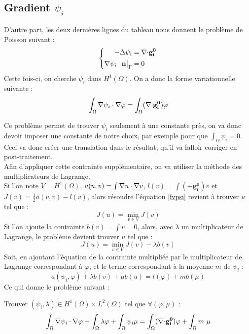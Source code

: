 \subsection{Gradient $\psi_i$}
\label{multLagrange}
D'autre part, les deux dernières lignes du tableau nous donnent le problème de Poisson suivant :
\begin{equation*}
\left\{\begin{aligned}
-{\Delta}\psi_i &= {\nabla\cdot} \mathbf{g_i^0}\\
{\nabla}\psi_i\cdot \mathbf{n}{\big\rvert_{\Gamma}} &= 0
\end{aligned}\right.
\end{equation*}
Cette fois-ci, on cherche $\psi_i$ dans $H^1(\Omega)$. On a donc la forme variationnelle suivante :
\begin{equation}\label{fvpsi}
\int_\Omega {\nabla}\psi_i\cdot{\nabla}\varphi = \int_\Omega ({\nabla\cdot} \mathbf{g_i^0})\varphi
\end{equation}

Ce problème permet de trouver $\psi_i$ seulement à une constante près, on va donc devoir imposer une constante de notre choix, par exemple pour que $\int_\Omega \psi_i = 0$. Ceci va donc créer une translation dans le résultat, qu'il va falloir corriger en post-traitement.\\
Afin d'appliquer cette contrainte supplémentaire, on va utiliser la méthode des multiplicateurs de Lagrange.\\
Si l'on note $V=H^1(\Omega)$, $a(u,v)=\int {\nabla} u \cdot {\nabla} v$, $l(v)=\int (\div \mathbf{g_i^0})v$ et $J(v)=\frac{1}{2}a(v,v)-l(v)$, alors résoudre l'équation \ref{fvpsi} revient à trouver $u$ tel que :
\[ J(u) = \min_{v\in V} J(v) \]
Si l'on ajoute la contrainte $b(v) = \int v = 0$, alors, avec $\lambda$ un multiplicateur de Lagrange, le problème devient trouver $u$ tel que :
\[ J(u) = \min_{v\in V} J(v) - \lambda b(v) \]
Soit, en ajoutant l'équation de la contrainte multipliée par le multiplicateur de Lagrange correspondant à $\varphi$, et le terme correspondant à la moyenne $m$ de $\psi_i$ :
\[ a(\psi_i,\varphi) + \lambda b(v) + \mu b(u) = l(\varphi) + m b(\mu) \]
Ce qui donne le problème suivant :
\begin{pb}\label{fvpsiml}
Trouver $(\psi_i,\lambda)\in H^1(\Omega)\times L^2(\Omega)$ tel que $\forall (\varphi,\mu)$ :
\begin{equation*}
\int_\Omega {\nabla}\psi_i\cdot{\nabla}\varphi + \int_\Omega \lambda\varphi + \int_\Omega \psi_i\mu = \int_\Omega ({\nabla\cdot} \mathbf{g_i^0})\varphi + \int_\Omega m\ \mu
\end{equation*}\end{pb}
